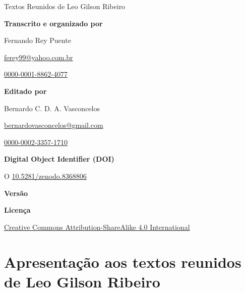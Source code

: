 \documentclass[
  a4paper,
  oneside]{scrbook}
\begin{document}
\bigskip

{\large{Textos Reunidos de Leo Gilson Ribeiro}}

\vfill

\textbf{Transcrito e organizado por}\smallskip

Fernando Rey Puente

\smallskip

\href{mailto:ferey99@yahoo.com.br}{ferey99@yahoo.com.br}

\smallskip

 \href{https://orcid.org/0000-0001-8862-4077}{0000-0001-8862-4077}

\vfill

\textbf{Editado por}

\smallskip

Bernardo C. D. A. Vasconcelos

\smallskip

\href{mailto:bernardovasconcelos@gmail.com}{bernardovasconcelos@gmail.com}

\smallskip

 \href{https://orcid.org/0000-0002-3357-1710}{0000-0002-3357-1710}

\vfill

\textbf{Digital Object Identifier (DOI)}

\smallskip

 {O} \href{https://doi.org/10.5281/zenodo.8368806}{10.5281/zenodo.8368806}

\vfill

\textbf{Versão}

\smallskip



\vfill

\textbf{Licença}

\smallskip

\ccbysa

\smallskip

\href{https://creativecommons.org/licenses/by-sa/4.0/}{Creative Commons Attribution-ShareAlike 4.0 International}

\cleardoublepage

\hypertarget{apresentauxe7uxe3o-aos-textos-reunidos-de-leo-gilson-ribeiro}{%
\section*{Apresentação aos textos reunidos de Leo Gilson
Ribeiro}\label{apresentauxe7uxe3o-aos-textos-reunidos-de-leo-gilson-ribeiro}}
\end{document}
